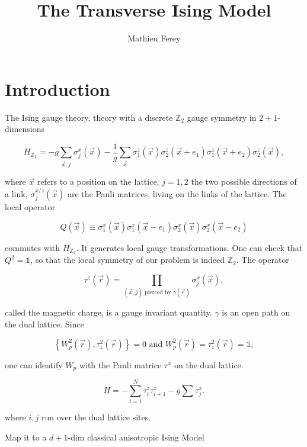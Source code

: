 \documentclass[11pt,openany]{article}
\title{The Transverse Ising Model }
\author{Mathieu Ferey}
\begin{document}
	


\section{Introduction}


The Ising gauge theory, theory with a discrete $\mathds{Z}_2$ gauge symmetry in $2+1$-dimensions

\begin{equation}
	H_{\mathds{Z}_2} = -g\sum_{\vec{x},j}\sigma^x_j(\vec{x}) - \frac{1}{g}\sum_{\vec{x}}\sigma_1^z(\vec{x})\sigma_2^z(\vec{x}+e_1)\sigma_1^z(\vec{x}+e_2)\sigma_2^z(\vec{x}),
\end{equation}

where $\vec{x}$ refers to a position on the lattice, $j=1,2$ the two possible directions of a link, $\sigma_j^{x/z}(\vec{x})$ are the Pauli matrices, living on the links of the lattice. The local operator

\begin{equation}
	Q(\vec{x}) \equiv \sigma_1^x(\vec{x})\sigma_1^x(\vec{x}-e_1)\sigma_2^x(\vec{x})\sigma_2^x(\vec{x}-e_2)
\end{equation}

commutes with $H_{\mathds{Z}_2}$. It generates local gauge transformations. One can check that $Q^2=\mathds{1}$, so that the local symmetry of our problem is indeed $\mathds{Z}_2$. The operator

\begin{equation}
	\tau^z(\vec{r}) = \prod_{(\vec{x},j) \text{ pierced by } \gamma(\vec{r})}\sigma_j^x(\vec{x}),
\end{equation}

called the magnetic charge, is a gauge invariant quantity. $\gamma$ is an open path on the dual lattice. Since

\begin{equation}
	\left\{W_p^2(\vec{r}),\tau_z^2(\vec{r})\right\} = 0\text{ and }W_p^2(\vec{r}) = \tau_z^2(\vec{r}) = \mathds{1},
\end{equation} 

one can identify $W_p$ with the Pauli matrice $\tau^x$ on  the dual lattice.

\begin{equation}
	H = -\sum_{i=1}^N\tau^z_i\tau^z_{i+1} - g\sum\tau^x_j.
\end{equation}

where $i,j$ run over the dual lattice sites.

Map it to a $d+1$-dim classical anisotropic Ising Model
\end{document}
